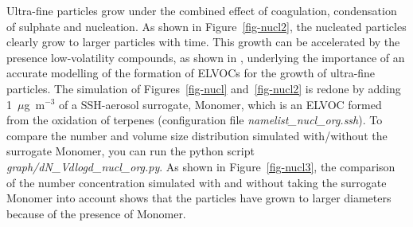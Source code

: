 \documentclass[a4paper,11pt]{article}
\begin{document}
Ultra-fine particles grow under the combined effect of coagulation,
condensation of sulphate and nucleation. 
As shown in Figure~\ref{fig-nucl2}, the nucleated particles clearly grow to larger particles with time.
This growth can be accelerated by the presence low-volatility compounds, as shown in \cite{pat18}, underlying the importance of an accurate modelling of the formation of ELVOCs for the growth of ultra-fine particles. 
The simulation of Figures~\ref{fig-nucl} and~\ref{fig-nucl2} is redone by adding 1~$\mu$g~m$^{-3}$ of a SSH-aerosol surrogate, Monomer, which is an ELVOC formed from the oxidation of terpenes (configuration file {\it{namelist\_nucl\_org.ssh}}).
To compare the number and volume size distribution simulated with/without the surrogate Monomer, you can run the python script {\it{graph/dN\_Vdlogd\_nucl\_org.py}}.
As shown in Figure~\ref{fig-nucl3}, the comparison of the number concentration simulated with and without taking the surrogate Monomer into account shows that 
the particles have grown to larger diameters because of the presence of Monomer. 
\end{document}
